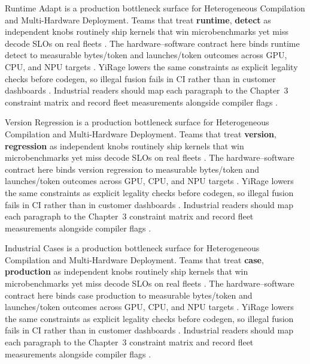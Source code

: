 Runtime Adapt is a production bottleneck surface for Heterogeneous Compilation and Multi-Hardware Deployment. Teams that treat \textbf{runtime}, \textbf{detect} as independent knobs routinely ship kernels that win microbenchmarks yet miss decode SLOs on real fleets \citep{amd2024aie,kwon2023vllm}. The hardware--software contract here binds runtime detect to measurable bytes/token and launches/token outcomes across GPU, CPU, and NPU targets \citep{dlbook,nvidia2024cudagraphs}. YiRage lowers the same constraints as explicit legality checks before codegen, so illegal fusion fails in CI rather than in customer dashboards \citep{dao2022flashattention,liu2024deepseekv3}. Industrial readers should map each paragraph to the Chapter~3 constraint matrix and record fleet measurements alongside compiler flags \citep{kwon2023vllm,patel2025llminference}.

Version Regression is a production bottleneck surface for Heterogeneous Compilation and Multi-Hardware Deployment. Teams that treat \textbf{version}, \textbf{regression} as independent knobs routinely ship kernels that win microbenchmarks yet miss decode SLOs on real fleets \citep{dlbook,nvidia2024cudagraphs}. The hardware--software contract here binds version regression to measurable bytes/token and launches/token outcomes across GPU, CPU, and NPU targets \citep{dao2022flashattention,liu2024deepseekv3}. YiRage lowers the same constraints as explicit legality checks before codegen, so illegal fusion fails in CI rather than in customer dashboards \citep{kwon2023vllm,patel2025llminference}. Industrial readers should map each paragraph to the Chapter~3 constraint matrix and record fleet measurements alongside compiler flags \citep{nvidia2024cudagraphs,taxbreak2026}.

Industrial Cases is a production bottleneck surface for Heterogeneous Compilation and Multi-Hardware Deployment. Teams that treat \textbf{case}, \textbf{production} as independent knobs routinely ship kernels that win microbenchmarks yet miss decode SLOs on real fleets \citep{dao2022flashattention,liu2024deepseekv3}. The hardware--software contract here binds case production to measurable bytes/token and launches/token outcomes across GPU, CPU, and NPU targets \citep{kwon2023vllm,patel2025llminference}. YiRage lowers the same constraints as explicit legality checks before codegen, so illegal fusion fails in CI rather than in customer dashboards \citep{nvidia2024cudagraphs,taxbreak2026}. Industrial readers should map each paragraph to the Chapter~3 constraint matrix and record fleet measurements alongside compiler flags \citep{liu2024deepseekv3,memoryfloor2026}.

